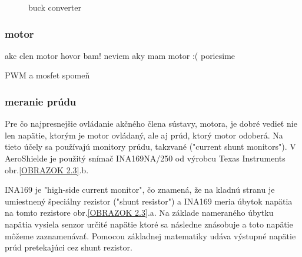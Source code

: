 \begin{figure}[!tbh]
\hfill
{}
\hfill
{}
\hfill
\caption{buck converter}\label{OBRAZOK 2.1}
\end{figure}


\subsubsection{motor}

akc clen motor hovor bam!
neviem aky mam motor :(
poriesime

PWM a mosfet spomeň

\vspace{4cm}

\subsubsection{meranie prúdu}

Pre čo najpresnejšie ovládanie akčného člena sústavy, motora, je dobré vedieť nie len napätie, ktorým je motor ovládaný, ale aj prúd, ktorý motor odoberá. Na tieto účely sa používajú monitory prúdu, takzvané ("current shunt monitors"). V AeroShielde je použitý snímač INA169NA/250 od výrobcu Texas Instruments obr.\ref{OBRAZOK 2.3}.b.

INA169 je "high-side current monitor", čo znamená, že na kladnú stranu je umiestnený špeciálny rezistor ("shunt resistor") a INA169 meria úbytok napätia na tomto rezistore obr.\ref{OBRAZOK 2.3}.a. Na základe nameraného úbytku napätia vysiela senzor určité napätie ktoré sa následne znásobuje a toto napätie môžeme zaznamenávať. Pomocou základnej matematiky udáva výstupné napätie prúd pretekajúci cez shunt rezistor\cite{INA}.


